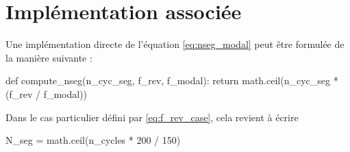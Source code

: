 \documentclass[12pt,a4paper, openany]{book}
\begin{document}
\section{Implémentation associée}

Une implémentation directe de l'équation \eqref{eq:nseg_modal} peut être formulée de la manière suivante :

\begin{codeboxpro}
def compute_nseg(n_cyc_seg, f_rev, f_modal):
    return math.ceil(n_cyc_seg * (f_rev / f_modal))
\end{codeboxpro}

Dans le cas particulier défini par \eqref{eq:f_rev_case}, cela revient à écrire
\begin{codeboxpro}
N_seg = math.ceil(n_cycles * 200 / 150)
\end{codeboxpro}




\end{document}
